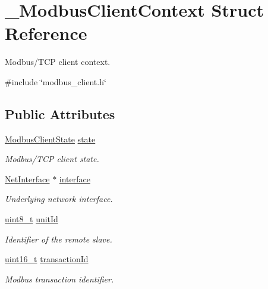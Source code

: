 \hypertarget{struct__ModbusClientContext}{}\section{\+\_\+\+Modbus\+Client\+Context Struct Reference}
\label{struct__ModbusClientContext}


Modbus/\+T\+CP client context.  




{\ttfamily \#include \char`\"{}modbus\+\_\+client.\+h\char`\"{}}

\subsection*{Public Attributes}
\begin{DoxyCompactItemize}
\item 
\hyperlink{modbus__client_8h_af9e4aa6eb4ddde054d9f23f72b3fb3fd}{Modbus\+Client\+State} \hyperlink{struct__ModbusClientContext_aec9ee7f031803363d2972d4bd405ad7f}{state}
\begin{DoxyCompactList}\small\item\em Modbus/\+T\+CP client state. \end{DoxyCompactList}\item 
\hyperlink{net_8h_a2234db8911a1148c9159979d8f5e0d6b}{Net\+Interface} $\ast$ \hyperlink{struct__ModbusClientContext_a0454bc60a65f66642aa5d86d18650e8e}{interface}
\begin{DoxyCompactList}\small\item\em Underlying network interface. \end{DoxyCompactList}\item 
\hyperlink{stdint_8h_aba7bc1797add20fe3efdf37ced1182c5}{uint8\+\_\+t} \hyperlink{struct__ModbusClientContext_a233639d3c88620f6e86a79c802b6f3e4}{unit\+Id}
\begin{DoxyCompactList}\small\item\em Identifier of the remote slave. \end{DoxyCompactList}\item 
\hyperlink{stdint_8h_a273cf69d639a59973b6019625df33e30}{uint16\+\_\+t} \hyperlink{struct__ModbusClientContext_aaa655337717c1b1f6f8fbaeaf6fceeb3}{transaction\+Id}
\begin{DoxyCompactList}\small\item\em Modbus transaction identifier. \end{DoxyCompactList}\item 

\end{DoxyCompactItemize}
